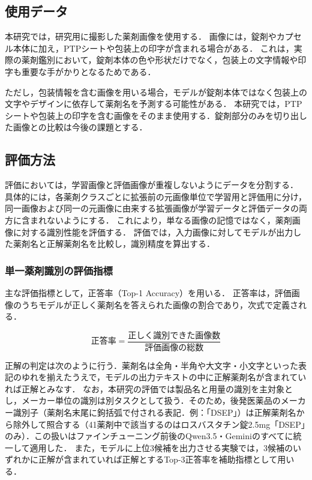 \documentclass[dvipdfmx]{jsarticle}
\begin{document}
\subsection{使用データ}

本研究では，研究用に撮影した薬剤画像を使用する．
画像には，錠剤やカプセル本体に加え，PTPシートや包装上の印字が含まれる場合がある．
これは，実際の薬剤鑑別において，錠剤本体の色や形状だけでなく，包装上の文字情報や印字も重要な手がかりとなるためである．

ただし，包装情報を含む画像を用いる場合，モデルが錠剤本体ではなく包装上の文字やデザインに依存して薬剤名を予測する可能性がある．
本研究では，PTPシートや包装上の印字を含む画像をそのまま使用する．錠剤部分のみを切り出した画像との比較は今後の課題とする．

\subsection{評価方法}

評価においては，学習画像と評価画像が重複しないようにデータを分割する．
具体的には，各薬剤クラスごとに拡張前の元画像単位で学習用と評価用に分け，同一画像および同一の元画像に由来する拡張画像が学習データと評価データの両方に含まれないようにする．
これにより，単なる画像の記憶ではなく，薬剤画像に対する識別性能を評価する．
評価では，入力画像に対してモデルが出力した薬剤名と正解薬剤名を比較し，識別精度を算出する．

\subsubsection{単一薬剤識別の評価指標}

主な評価指標として，正答率（Top-1 Accuracy）を用いる．
正答率は，評価画像のうちモデルが正しく薬剤名を答えられた画像の割合であり，次式で定義される．

\begin{equation}
\text{正答率} = \frac{\text{正しく識別できた画像数}}{\text{評価画像の総数}}
\label{eq:top1}
\end{equation}

正解の判定は次のように行う．薬剤名は全角・半角や大文字・小文字といった表記のゆれを揃えたうえで，モデルの出力テキストの中に正解薬剤名が含まれていれば正解とみなす．
なお，本研究の評価では製品名と用量の識別を主対象とし，メーカー単位の識別は別タスクとして扱う．そのため，後発医薬品のメーカー識別子（薬剤名末尾に鉤括弧で付される表記．例：「DSEP」）は正解薬剤名から除外して照合する（41薬剤中で該当するのはロスバスタチン錠2.5mg「DSEP」のみ）．この扱いはファインチューニング前後のQwen3.5・Geminiのすべてに統一して適用した．
また，モデルに上位3候補を出力させる実験では，3候補のいずれかに正解が含まれていれば正解とするTop-3正答率を補助指標として用いる．
\end{document}
